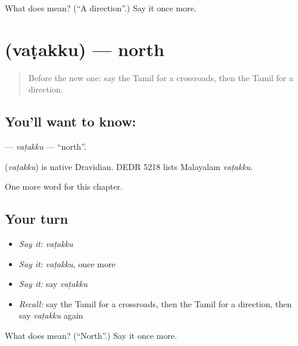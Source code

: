\begin{tcolorbox}[breakable,colback=teal!4,colframe=teal!35!black,title={Before you move on}]
What does  mean? (\textquotedblleft{}A direction\textquotedblright{}.) Say it once more.
\end{tcolorbox}
\section[\texorpdfstring{\ta{வடக்கு} (vaṭakku)}{வடக்கு (vaṭakku)}]{ (vaṭakku) — north}

\label{lesson:TA-C235-vatakku}



\begin{quote}
Before the new one: say the Tamil for a crossroads, then the Tamil for a direction.
\end{quote}

\subsection*{You'll want to know: }
\textbf{} — \emph{vaṭakku} — \textquotedblleft{}north\textquotedblright{}.

\begin{cousinweb}
\textbf{} (\emph{vaṭakku}) is native Dravidian. DEDR 5218 lists Malayalam \emph{vaṭakku}.
\end{cousinweb}

\begin{grammarlens}[title={What you've built}]
One more word for this chapter.
\end{grammarlens}

\subsection*{Your turn}
\begin{itemize}
\raggedright
  \item \emph{Say it:} \emph{vaṭakku}
  \item \emph{Say it:} \emph{vaṭakku}, once more
  \item \emph{Say it:} say \emph{vaṭakku}
  \item \emph{Recall:} say the Tamil for a crossroads, then the Tamil for a direction, then say \emph{vaṭakku} again
\end{itemize}

\begin{tcolorbox}[breakable,colback=teal!4,colframe=teal!35!black,title={Before you move on}]
What does  mean? (\textquotedblleft{}North\textquotedblright{}.) Say it once more.
\end{tcolorbox}
